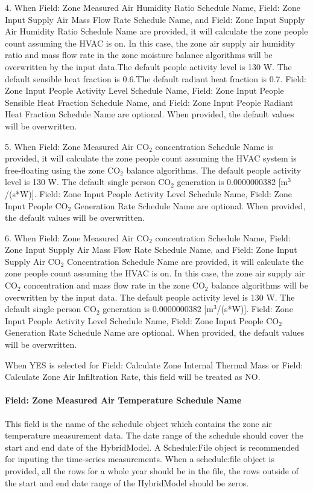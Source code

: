 4. When Field: Zone Measured Air Humidity Ratio Schedule Name, Field: Zone Input Supply Air Mass Flow Rate Schedule Name, and Field: Zone Input Supply Air Humidity Ratio Schedule Name are provided, it will calculate the zone people count assuming the HVAC is on. In this case, the zone air supply air humidity ratio and mass flow rate in the zone moisture balance algorithms will be overwritten by the input data.The default people activity level is 130 W. The default sensible heat fraction is 0.6.The default radiant heat fraction is 0.7. Field: Zone Input People Activity Level Schedule Name, Field: Zone Input People Sensible Heat Fraction Schedule Name, and Field: Zone Input People Radiant Heat Fraction Schedule Name are optional. When provided, the default values will be overwritten.

5. When Field: Zone Measured Air CO$_2$ concentration Schedule Name is provided, it will calculate the zone people count assuming the HVAC system is free-floating using the zone CO$_2$ balance algorithms. The default people activity level is 130 W. The default single person CO$_2$ generation is 0.0000000382 [m$^3$/(s*W)]. Field: Zone Input People Activity Level Schedule Name, Field: Zone Input People CO$_2$ Generation Rate Schedule Name are optional. When provided, the default values will be overwritten.

6. When Field: Zone Measured Air CO$_2$ concentration Schedule Name, Field: Zone Input Supply Air Mass Flow Rate Schedule Name, and Field: Zone Input Supply Air CO$_2$ Concentration Schedule Name are provided, it will calculate the zone people count assuming the HVAC is on. In this case, the zone air supply air CO$_2$ concentration and mass flow rate in the zone CO$_2$ balance algorithms will be overwritten by the input data. The default people activity level is 130 W. The default single person CO$_2$ generation is 0.0000000382 [m$^3$/(s*W)]. Field: Zone Input People Activity Level Schedule Name, Field: Zone Input People CO$_2$ Generation Rate Schedule Name are optional. When provided, the default values will be overwritten.

When YES is selected for Field: Calculate Zone Internal Thermal Mass or Field: Calculate Zone Air Infiltration Rate, this field will be treated as NO.

\paragraph{Field: Zone Measured Air Temperature Schedule Name}\label{field-zone-measured-air-temperature-schedule-name-hm}
This field is the name of the schedule object which contains the zone air temperature measurement data. The date range of the schedule should cover the start and end date of the HybridModel. A Schedule:File object is recommended for inputing the time-series measurements. When a schedule:file object is provided, all the rows for a whole year should be in the file, the rows outside of the start and end date range of the HybridModel should be zeros.

